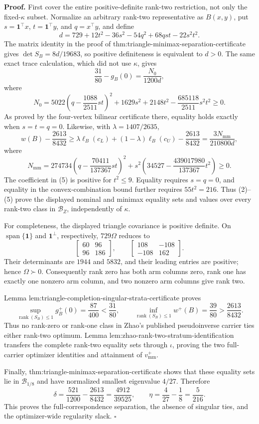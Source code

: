 \textbf{Proof.}
First cover the entire positive-definite rank-two restriction, not only the fixed-\(\kappa\) subset.  Normalize an arbitrary rank-two representative as \(B(x,y)\), put \(s=\mathbf1^{\top}x\), \(t=\mathbf1^{\top}y\), and \(q=x^{\top}y\), and define
\[
d=729+12t^2-36s^2-54q^2+68qst-22s^2t^2.
\tag{1}
\]
The matrix identity in the proof of thm:triangle-minimax-separation-certificate gives \(\det S_B=8d/19683\), so positive definiteness is equivalent to \(d>0\).  The same exact trace calculation, which did not use \(\kappa\), gives
\[
\frac{31}{80}-g_B(0)=\frac{N_0}{1200d},
\tag{2}
\]
where
\[
N_0=5022\left(q-\frac{1088}{2511}st\right)^2
+1629s^2+2148t^2-\frac{685118}{2511}s^2t^2\ge0.
\tag{3}
\]
As proved by the four-vertex bilinear certificate there, equality holds exactly when \(s=t=q=0\).  Likewise, with \(\lambda=1407/2635\),
\[
w(B)-\frac{2613}{8432}
\ge\lambda\ell_B(c_L)+(1-\lambda)\ell_B(c_U)-\frac{2613}{8432}
=\frac{3N_{\mathrm{mm}}}{210800d},
\tag{4}
\]
where
\[
N_{\mathrm{mm}}
=274734\left(q-\frac{70411}{137367}st\right)^2
+s^2\left(34527-\frac{439017980}{137367}t^2\right)\ge0.
\tag{5}
\]
The coefficient in (5) is positive for \(t^2\le9\).  Equality requires \(s=q=0\), and equality in the convex-combination bound further requires \(55t^2=216\).  Thus (2)--(5) prove the displayed nominal and minimax equality sets and values over every rank-two class in \(\mathcal B_Z\), independently of \(\kappa\).

For completeness, the displayed triangle covariance is positive definite.  On \(\operatorname{span}\{\mathbf1\}\) and \(\mathbf1^\perp\), respectively, \(729\Omega\) reduces to
\[
\begin{bmatrix}60&96\\96&186\end{bmatrix},
\qquad
\begin{bmatrix}108&-108\\-108&162\end{bmatrix}.
\tag{6}
\]
Their determinants are \(1944\) and \(5832\), and their leading entries are positive; hence \(\Omega\succ0\).  Consequently rank zero has both arm columns zero, rank one has exactly one nonzero arm column, and two nonzero arm columns give rank two.

Lemma lem:triangle-completion-singular-strata-certificate proves
\[
\sup_{\operatorname{rank}(S_B)\le1}g_B^+(0)
=\frac{87}{400}<\frac{31}{80},
\qquad
\inf_{\operatorname{rank}(S_B)\le1}w^+(B)
=\frac{39}{80}>\frac{2613}{8432}.
\tag{7}
\]
Thus no rank-zero or rank-one class in Zhao's published pseudoinverse carrier ties either rank-two optimum.  Lemma lem:zhao-rank-two-stratum-identification transfers the complete rank-two equality sets through \(\iota\), proving the two full-carrier optimizer identities and attainment of \(v_{\mathrm{mm}}^+\).

Finally, thm:triangle-minimax-separation-certificate shows that these equality sets lie in \(\mathcal B_{1/8}\) and have normalized smallest eigenvalue \(4/27\).  Therefore
\[
\delta=\frac{521}{1200}-\frac{2613}{8432}
=\frac{4912}{39525},
\qquad
\eta=\frac4{27}-\frac18=\frac5{216}.
\]
This proves the full-correspondence separation, the absence of singular ties, and the optimizer-wide regularity slack.  \(\square\)
